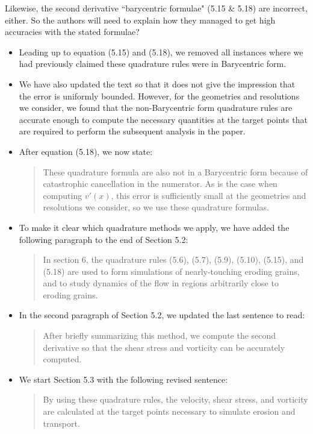 \documentclass[11pt]{article}
\newcommand{\comment}[1]{{\color{blue} #1}}
\begin{document}
\noindent
\comment{Likewise, the second derivative ``barycentric formulae" (5.15 \& 5.18) are incorrect, either. So the authors will need to explain how they managed to get high accuracies with the stated formulae?}
\begin{itemize}
  \item Leading up to equation (5.15) and (5.18), we removed all
    instances where we had previously claimed these quadrature rules
    were in Barycentric form.

  \item We have also updated the text so that it does not give the
    impression that the error is uniformly bounded. However, for the
    geometries and resolutions we consider, we found that the
    non-Barycentric form quadrature rules are accurate enough to compute
    the necessary quantities at the target points that are required to
    perform the subsequent analysis in the paper.

  \item After equation (5.18), we now state:
    \begin{quotation}
      \noindent
      These quadrature formula are also not in a Barycentric form
      because of catastrophic cancellation in the numerator. As is the
      case when computing $v′(x)$, this error is sufficiently small at
      the geometries and resolutions we consider, so we use these
      quadrature formulas.
    \end{quotation}

  \item To make it clear which quadrature methods we apply, we have
    added the following paragraph to the end of Section 5.2:
    \begin{quotation}
      \noindent
      In section 6, the quadrature rules (5.6), (5.7), (5.9), (5.10),
      (5.15), and (5.18) are used to form simulations of nearly-touching
      eroding grains, and to study dynamics of the flow in regions
      arbitrarily close to eroding grains.
    \end{quotation}

  \item In the second paragraph of Section 5.2, we updated the last
    sentence to read:
    \begin{quotation}
      \noindent
      After briefly summarizing this method, we compute the second
      derivative so that the shear stress and vorticity can be
      accurately computed.
    \end{quotation}

  \item We start Section 5.3 with the following revised sentence:
    \begin{quotation}
      \noindent
      By using these quadrature rules, the velocity, shear stress, and
      vorticity are calculated at the target points necessary to
      simulate erosion and transport.
    \end{quotation}

\end{itemize}
\end{document}
